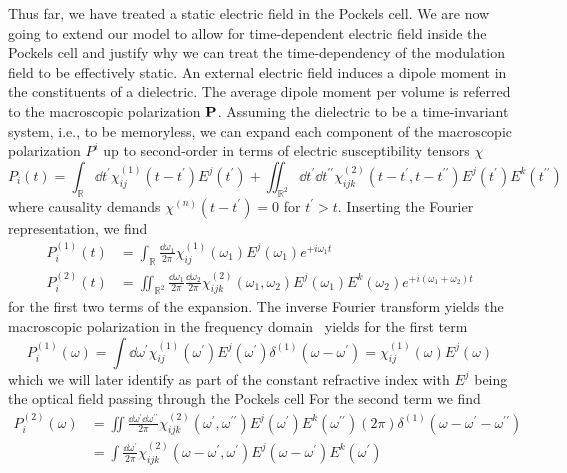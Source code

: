 Thus far, we have treated a static electric field in the Pockels cell.
We are now going to extend our model to allow for time-dependent electric field inside the Pockels cell and justify why we can treat the time-dependency of the modulation field to be effectively static.
An external electric field induces a dipole moment in the constituents of a dielectric.
The average dipole moment per volume is referred to the macroscopic polarization $\vb{P}$.
Assuming the dielectric to be a time-invariant system, i.e., to be memoryless, we can expand each component of the macroscopic polarization $P^i$ up to second-order in terms of electric susceptibility tensors $\chi$~\cite[p.~17]{Murti2014}
\begin{equation}
	P_i(t)
	=
	\int_{\mathbb{R}}\dd{t^\prime}
	\chi^{(1)}_{ij}(t-t^\prime)
	E^j(t^\prime)
	+
	\iint_{\mathbb{R}^2}\dd{t^\prime}\dd{t^{\prime\prime}}
	\chi^{(2)}_{ijk}(t-t^\prime,t-t^{\prime\prime})
	E^j(t^\prime)E^k(t^{\prime\prime})
\end{equation}
where causality demands $\chi^{(n)}(t-t^\prime)=0$ for $t^\prime>t$.
Inserting the Fourier representation, we find
\begin{align}
	P_i^{(1)}(t)
	&=
	\int_{\mathbb{R}}
	\frac{\dd{\omega_1}}{2\pi}
	\chi^{(1)}_{ij}(\omega_1)
	E^j(\omega_1)
	e^{+i\omega_1t}
	\\
	P_i^{(2)}(t)
	&=
	\iint_{\mathbb{R}^2}
	\frac{\dd{\omega_1}}{2\pi}
	\frac{\dd{\omega_2}}{2\pi}
	\chi^{(2)}_{ijk}(\omega_1,\omega_2)
	E^j(\omega_1)E^k(\omega_2)
	e^{+i(\omega_1+\omega_2)t}	
\end{align}
for the first two terms of the expansion.
The inverse Fourier transform yields the macroscopic polarization in the frequency domain~\cite[p.~1070]{Mandel1995} yields for the first term
\begin{equation}
	P_i^{(1)}(\omega)
	=
	\int\dd{\omega^\prime}
	\chi^{(1)}_{ij}(\omega^\prime)
	E^j(\omega^\prime)
	\delta^{(1)}(\omega-\omega^\prime)
	=
	\chi^{(1)}_{ij}(\omega)
	E^j(\omega)
\end{equation}
which we will later identify as part of the constant refractive index with $E^j$ being the optical field passing through the Pockels cell
For the second term we find
\begin{equation}
	\begin{split}
		P_i^{(2)}(\omega)
		&=
		\iint\frac{\dd{\omega^\prime}\dd{\omega^{\prime\prime}}}{2\pi}
		\chi^{(2)}_{ijk}(\omega^\prime,\omega^{\prime\prime})
		E^j(\omega^\prime)
		E^k(\omega^{\prime\prime})
		(2\pi)	
		\delta^{(1)}(\omega-\omega^\prime-\omega^{\prime\prime})
		\\
		&=
		\int\frac{\dd{\omega^\prime}}{2\pi}
		\chi^{(2)}_{ijk}(\omega-\omega^\prime,\omega^\prime)
		E^j(\omega-\omega^\prime)
		E^k(\omega^\prime)
	\end{split}
\end{equation}
